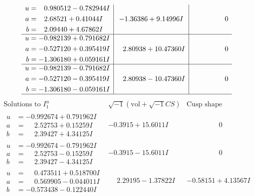 \documentclass[1p]{elsarticle_modified}
\theoremstyle{definition}
\newcommand{\I}{\sqrt{-1}}
\begin{document}
$$\begin{array}{c|c|c}
\begin{aligned}
u &= \phantom{-}0.980512 - 0.782944 I \\
a &= \phantom{-}2.68521 + 0.41044 I \\
b &= \phantom{-}2.09440 + 4.67862 I\end{aligned}
 & -1.36386 + 9.14996 I & \phantom{-0.000000 } 0 \\ \hline\begin{aligned}
u &= -0.982139 + 0.791682 I \\
a &= -0.527120 + 0.395419 I \\
b &= -1.306180 + 0.059161 I\end{aligned}
 & \phantom{-}2.80938 + 10.47360 I & \phantom{-0.000000 } 0 \\ \hline\begin{aligned}
u &= -0.982139 - 0.791682 I \\
a &= -0.527120 - 0.395419 I \\
b &= -1.306180 - 0.059161 I\end{aligned}
 & \phantom{-}2.80938 - 10.47360 I & \phantom{-0.000000 } 0\\
 \hline 
 \end{array}$$\newpage$$\begin{array}{c|c|c}  
\text{Solutions to }I^u_{1}& \I (\text{vol} + \sqrt{-1}CS) & \text{Cusp shape}\\
 \hline 
\begin{aligned}
u &= -0.992674 + 0.791962 I \\
a &= \phantom{-}2.52753 + 0.15259 I \\
b &= \phantom{-}2.39427 + 4.34125 I\end{aligned}
 & -0.3915 + 15.6011 I & \phantom{-0.000000 } 0 \\ \hline\begin{aligned}
u &= -0.992674 - 0.791962 I \\
a &= \phantom{-}2.52753 - 0.15259 I \\
b &= \phantom{-}2.39427 - 4.34125 I\end{aligned}
 & -0.3915 - 15.6011 I & \phantom{-0.000000 } 0 \\ \hline\begin{aligned}
u &= \phantom{-}0.473511 + 0.518700 I \\
a &= \phantom{-}0.569905 - 0.044011 I \\
b &= -0.573438 - 0.122440 I\end{aligned}
 & \phantom{-}2.29195 - 1.37822 I & -0.58151 + 4.13567 I \\ \hline\begin{aligned}

\end{aligned}
\end{array}$$
\end{document}
